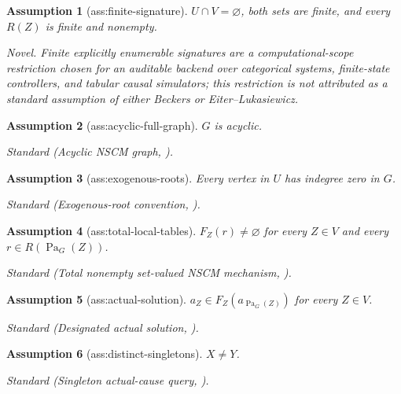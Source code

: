 \documentclass{article}
\newtheorem{assumption}{Assumption}
\begin{document}
\begin{assumption}[ass:finite-signature]\label{ass:finite-signature}
\(U\cap V=\varnothing\), both sets are finite, and every \(R(Z)\) is finite and nonempty.
\par\smallskip\noindent\emph{Novel.} Finite explicitly enumerable signatures are a computational-scope restriction chosen for an auditable backend over categorical systems, finite-state controllers, and tabular causal simulators; this restriction is not attributed as a standard assumption of either Beckers or Eiter--Lukasiewicz.
\end{assumption}

\begin{assumption}[ass:acyclic-full-graph]\label{ass:acyclic-full-graph}
\(G\) is acyclic.
\par\smallskip\noindent\emph{Standard} (Acyclic NSCM graph, \cite{Beckers2025NCM}).
\end{assumption}

\begin{assumption}[ass:exogenous-roots]\label{ass:exogenous-roots}
Every vertex in \(U\) has indegree zero in \(G\).
\par\smallskip\noindent\emph{Standard} (Exogenous-root convention, \cite{Beckers2025NCM}).
\end{assumption}

\begin{assumption}[ass:total-local-tables]\label{ass:total-local-tables}
\(F_Z(r)\ne\varnothing\) for every \(Z\in V\) and every \(r\in R(\operatorname{Pa}_G(Z))\).
\par\smallskip\noindent\emph{Standard} (Total nonempty set-valued NSCM mechanism, \cite{Beckers2025NCM}).
\end{assumption}

\begin{assumption}[ass:actual-solution]\label{ass:actual-solution}
\(a_Z\in F_Z(a_{\operatorname{Pa}_G(Z)})\) for every \(Z\in V\).
\par\smallskip\noindent\emph{Standard} (Designated actual solution, \cite{Beckers2025NCM}).
\end{assumption}

\begin{assumption}[ass:distinct-singletons]\label{ass:distinct-singletons}
\(X\ne Y\).
\par\smallskip\noindent\emph{Standard} (Singleton actual-cause query, \cite{Beckers2025Actual}).
\end{assumption}
\end{document}
